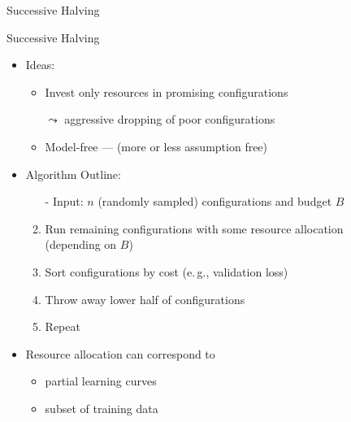 {
\begin{frame}[c,fragile]{Successive Halving }

\begin{block}{Successive Halving}
\begin{itemize}
  \item Ideas: 
  \begin{itemize}
    \item Invest only resources in promising configurations
    \item[$\leadsto$] aggressive dropping of poor configurations
    \item Model-free --- (more or less assumption free)
  \end{itemize}
  \pause
  \item Algorithm Outline:
  \begin{enumerate}
    \item[-] Input: $n$ (randomly sampled) configurations and budget $B$
    \pause
    \item Run remaining configurations with some resource allocation\\ (depending on $B$)
    \pause
    \item Sort configurations by cost (e.$\,$g., validation loss)
    \item Throw away lower half of configurations
    \pause
    \item Repeat
  \end{enumerate}
  \pause
  \item Resource allocation can correspond to
  \begin{itemize}
    \item partial learning curves
    \item subset of training data
  \end{itemize}
\end{itemize}
\end{block}

\end{frame}
}
